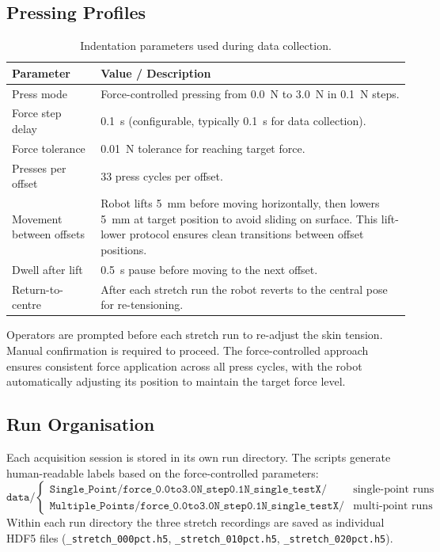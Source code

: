 \documentclass[11pt,a4paper]{article}
\begin{document}
\subsection{Pressing Profiles}
\begin{table}[H]
    \centering
    \caption{Indentation parameters used during data collection.}
    \begin{tabular}{@{}p{6.0cm}p{8.0cm}@{}}
        \toprule
        Parameter & Value / Description \\
        \midrule
        Press mode & Force-controlled pressing from \SI{0.0}{\newton} to \SI{3.0}{\newton} in \SI{0.1}{\newton} steps. \\
        Force step delay & \SI{0.1}{\second} (configurable, typically \SI{0.1}{\second} for data collection). \\
        Force tolerance & \SI{0.01}{\newton} tolerance for reaching target force. \\
        Presses per offset & 33 press cycles per offset. \\
        Movement between offsets & Robot lifts \SI{5}{\milli\metre} before moving horizontally, then lowers \SI{5}{\milli\metre} at target position to avoid sliding on surface. This lift-lower protocol ensures clean transitions between offset positions. \\
        Dwell after lift & \SI{0.5}{\second} pause before moving to the next offset. \\
        Return-to-centre & After each stretch run the robot reverts to the central pose for re-tensioning. \\
        \bottomrule
    \end{tabular}
\end{table}
Operators are prompted before each stretch run to re-adjust the skin tension. Manual
confirmation is required to proceed. The force-controlled approach ensures consistent force application
across all press cycles, with the robot automatically adjusting its position to maintain the target force level.

\subsection{Run Organisation}
Each acquisition session is stored in its own run directory. The scripts generate
human-readable labels based on the force-controlled parameters:
\[
\texttt{data/}\begin{cases}
    \texttt{Single\_Point/force\_0.0to3.0N\_step0.1N\_single\_testX/} & \text{single-point runs}\\
    \texttt{Multiple\_Points/force\_0.0to3.0N\_step0.1N\_single\_testX/} & \text{multi-point runs}
\end{cases}
\]
Within each run directory the three stretch recordings are saved as individual HDF5 files
(\texttt{\_stretch\_000pct.h5}, \texttt{\_stretch\_010pct.h5}, \texttt{\_stretch\_020pct.h5}).
\end{document}
